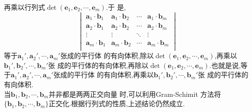 \documentclass[a4paper]{article}
\begin{document}
再乘以行列式$\det (\mathbf{e}_1,\mathbf{e}_2,\cdots,\mathbf{e}_m)$.于
是,
\begin{equation}
  \label{eq:2}
  \begin{vmatrix}
  \mathbf{a}_1\cdot \mathbf{b}_1&\mathbf{a}_1\cdot
  \mathbf{b}_2&\cdots&\mathbf{a}_1\cdot \mathbf{b}_m\\
  \mathbf{a}_2\cdot \mathbf{b}_1&\mathbf{a}_2\cdot
  \mathbf{b}_2&\cdots&\mathbf{a}_2\cdot \mathbf{b}_m\\
\vdots&\vdots&\ddots&\vdots\\
  \mathbf{a}_m\cdot \mathbf{b}_1&\mathbf{a}_m\cdot
  \mathbf{b}_2&\cdots&\mathbf{a}_m\cdot \mathbf{b}_m\\
\end{vmatrix}
\end{equation}
等于$\mathbf{a}_1',\mathbf{a}_2',\cdots,\mathbf{a}_m'$张成的平行体
的有向体积,除以$\det (\mathbf{e}_1,\mathbf{e}_2,\cdots,\mathbf{e}_m)$,再乘以$\mathbf{b}_1',\mathbf{b}_2',\cdots,\mathbf{b}_m'$张
成的平行体的有向体积,再除以$\det
(\mathbf{e}_1,\mathbf{e}_2,\cdots,\mathbf{e}_m)$.也就是说,等于$\mathbf{a}_1',\mathbf{a}_2',\cdots,\mathbf{a}_m'$张成的平行体
的有向体积,再乘以$\mathbf{b}_1',\mathbf{b}_2',\cdots,\mathbf{b}_m'$张
成的平行体的有向体积.
\\

当$\mathbf{b}_1,\mathbf{b}_2,\cdots,\mathbf{b}_m$并非都是两两正交向量
时,可以利用Gram-Schimit 方法将
$\{\mathbf{b}_1,\mathbf{b}_2,\cdots,\mathbf{b}_m\}$正交化.根据行列式的性质,上述结论仍然成立.
\end{document}
